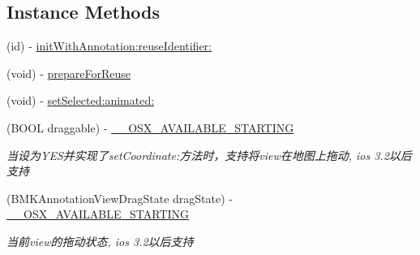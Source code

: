 \subsection*{Instance Methods}
\begin{DoxyCompactItemize}
\item 
(id) -\/ \hyperlink{interface_b_m_k_annotation_view_ae2b46541ec52b7d8ee0857a9ec369f5f}{init\+With\+Annotation\+:reuse\+Identifier\+:}
\item 
(void) -\/ \hyperlink{interface_b_m_k_annotation_view_ae74849e624ac0cfaa7695b7cc97ddf23}{prepare\+For\+Reuse}
\item 
(void) -\/ \hyperlink{interface_b_m_k_annotation_view_abc0e70812fb7b3bccdbb574ddb578c21}{set\+Selected\+:animated\+:}
\item 
\hypertarget{interface_b_m_k_annotation_view_a54d15e7cc4e89d89d2233ec7fc408ad9}{}(B\+O\+O\+L draggable) -\/ \hyperlink{interface_b_m_k_annotation_view_a54d15e7cc4e89d89d2233ec7fc408ad9}{\+\_\+\+\_\+\+O\+S\+X\+\_\+\+A\+V\+A\+I\+L\+A\+B\+L\+E\+\_\+\+S\+T\+A\+R\+T\+I\+N\+G}\label{interface_b_m_k_annotation_view_a54d15e7cc4e89d89d2233ec7fc408ad9}

\begin{DoxyCompactList}\small\item\em 当设为\+Y\+E\+S并实现了set\+Coordinate\+:方法时，支持将view在地图上拖动, ios 3.\+2以后支持 \end{DoxyCompactList}\item 
\hypertarget{interface_b_m_k_annotation_view_a623e818d48c983176a6553104b21a34c}{}(B\+M\+K\+Annotation\+View\+Drag\+State drag\+State) -\/ \hyperlink{interface_b_m_k_annotation_view_a623e818d48c983176a6553104b21a34c}{\+\_\+\+\_\+\+O\+S\+X\+\_\+\+A\+V\+A\+I\+L\+A\+B\+L\+E\+\_\+\+S\+T\+A\+R\+T\+I\+N\+G}\label{interface_b_m_k_annotation_view_a623e818d48c983176a6553104b21a34c}

\begin{DoxyCompactList}\small\item\em 当前view的拖动状态, ios 3.\+2以后支持 \end{DoxyCompactList}\end{DoxyCompactItemize}
